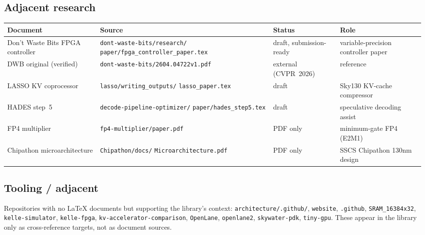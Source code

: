 \documentclass[11pt]{article}
\begin{document}
\subsection{Adjacent research}

\begin{center}
\renewcommand{\arraystretch}{1.2}
\setlength{\tabcolsep}{4pt}
\begin{tabular}{@{}p{}p{}lp{}@{}}
\toprule
\textbf{Document} & \textbf{Source} & \textbf{Status} & \textbf{Role} \\
\midrule
Don't Waste Bits FPGA controller & \texttt{dont-waste-bits/research/}
                                    \texttt{paper/fpga\_controller\_paper.tex}
  & draft, submission-ready & variable-precision controller paper \\
DWB original (verified)          & \texttt{dont-waste-bits/2604.04722v1.pdf}
  & external (CVPR~2026) & reference \\
LASSO KV coprocessor             & \texttt{lasso/writing\_outputs/}
                                    \texttt{lasso\_paper.tex}
  & draft & Sky130 KV-cache compressor \\
HADES step~5                     & \texttt{decode-pipeline-optimizer/}
                                    \texttt{paper/hades\_step5.tex}
  & draft & speculative decoding assist \\
FP4 multiplier                   & \texttt{fp4-multiplier/paper.pdf}
  & PDF only & minimum-gate FP4 (E2M1) \\
Chipathon microarchitecture      & \texttt{Chipathon/docs/}
                                    \texttt{Microarchitecture.pdf}
  & PDF only & SSCS Chipathon 130nm design \\
\bottomrule
\end{tabular}
\end{center}

\subsection{Tooling / adjacent}

Repositories with no LaTeX documents but supporting the library's
context: \texttt{architecture/.github/}, \texttt{website},
\texttt{.github}, \texttt{SRAM\_16384x32}, \texttt{kelle-simulator},
\texttt{kelle-fpga}, \texttt{kv-accelerator-comparison},
\texttt{OpenLane}, \texttt{openlane2}, \texttt{skywater-pdk},
\texttt{tiny-gpu}. These appear in the library only as cross-reference
targets, not as document sources.
\end{document}
